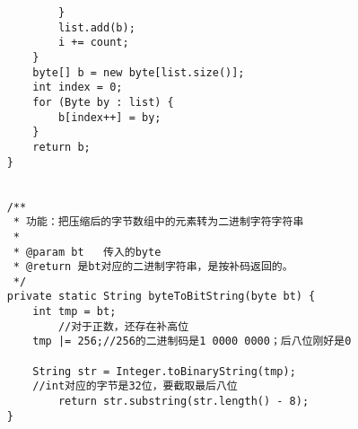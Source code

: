 \documentclass[a4paper]{report}
\begin{document}
\begin{lstlisting}
            }
            list.add(b);
            i += count;
        }
        byte[] b = new byte[list.size()];
        int index = 0;
        for (Byte by : list) {
            b[index++] = by;
        }
        return b;
    }


    /**
     * 功能：把压缩后的字节数组中的元素转为二进制字符字符串
     *
     * @param bt   传入的byte
     * @return 是bt对应的二进制字符串，是按补码返回的。
     */
    private static String byteToBitString(byte bt) {
        int tmp = bt;
            //对于正数，还存在补高位
        tmp |= 256;//256的二进制码是1 0000 0000；后八位刚好是0

        String str = Integer.toBinaryString(tmp);
        //int对应的字节是32位，要截取最后八位
            return str.substring(str.length() - 8);
    }
\end{lstlisting}
\end{document}
